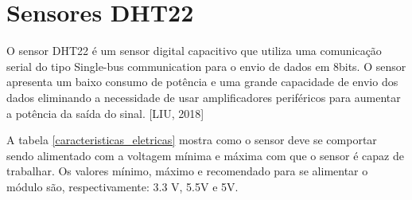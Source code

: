 \section{Sensores DHT22}

O sensor DHT22 é um sensor digital capacitivo que utiliza uma comunicação serial do tipo Single-bus communication para o envio de dados em 8bits. O sensor apresenta um baixo consumo de potência e uma grande capacidade de envio dos dados eliminando a necessidade de usar amplificadores periféricos para aumentar a potência da saída do sinal\cite{liu2018}. [LIU, 2018]

A tabela \ref{caracteristicas_eletricas} mostra como o sensor deve se comportar sendo alimentado com a voltagem mínima e máxima com que o sensor é capaz de trabalhar. Os valores mínimo, máximo e recomendado para se alimentar o módulo são, respectivamente: 3.3 V, 5.5V e 5V.

